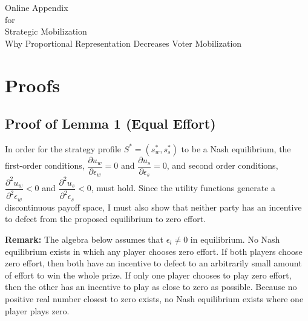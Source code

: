 \documentclass[12pt]{article}
\begin{document}
\begin{appendix}

\newpage


\begin{center}
{\LARGE Online Appendix}\\\vspace{2mm}
{for}\\\vspace{2mm}
{\Large Strategic Mobilization}\\\vspace{2mm}
{\large Why Proportional Representation Decreases Voter Mobilization}\\
\end{center}


\tableofcontents

\section{Proofs}

\subsection{Proof of Lemma 1 (Equal Effort)}

In order for the strategy profile $ S^* = (s_w^*, s_s^*)$ to be a Nash equilibrium, the first-order conditions, $\dfrac{\partial u_w}{\partial \epsilon_w} = 0$ and $\dfrac{\partial u_s}{\partial \epsilon_s} = 0$, and second order conditions, $\dfrac{\partial ^2u_w}{\partial ^2\epsilon_w} < 0$ and $\dfrac{\partial ^2u_s}{\partial ^2\epsilon_s} < 0$, must hold. Since the utility functions generate a discontinuous payoff space, I must also show that neither party has an incentive to defect from the proposed equilibrium to zero effort.

\textbf{Remark:} The algebra below assumes that $\epsilon_i \neq 0$ in equilibrium. No Nash equilibrium exists in which any player chooses zero effort. If both players choose zero effort, then both have an incentive to defect to an arbitrarily small amount of effort to win the whole prize. If only one player chooses to play zero effort, then the other has an incentive to play as close to zero as possible. Because no positive real number closest to zero exists, no Nash equilibrium exists where one player plays zero.


\end{appendix}
\end{document}

